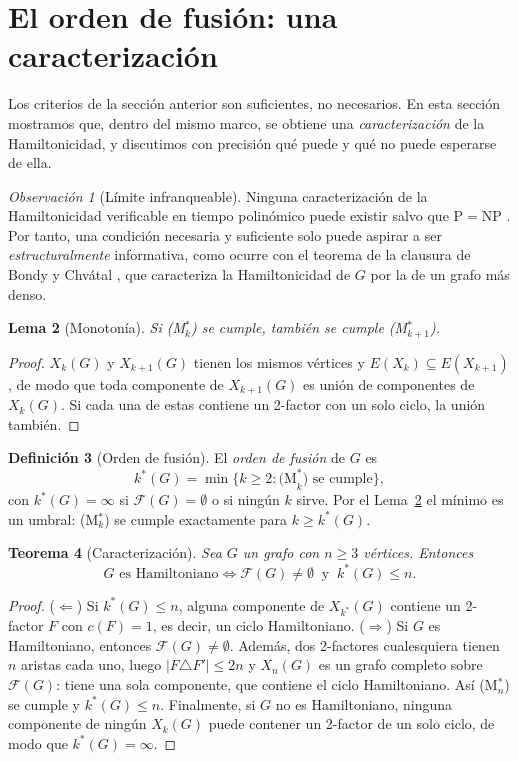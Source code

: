 \documentclass[11pt,a4paper]{article}
\newtheorem{teorema}{Teorema}[section]
\newtheorem{lema}[teorema]{Lema}
\theoremstyle{definition}
\newtheorem{definicion}[teorema]{Definición}
\theoremstyle{remark}
\newtheorem{observacion}[teorema]{Observación}
\begin{document}
\section{El orden de fusión: una caracterización}\label{sec:kstar}

Los criterios de la sección anterior son suficientes, no necesarios. En esta sección mostramos que, dentro del mismo marco, se obtiene una \emph{caracterización} de la Hamiltonicidad, y discutimos con precisión qué puede y qué no puede esperarse de ella.

\begin{observacion}[Límite infranqueable]
Ninguna caracterización de la Hamiltonicidad verificable en tiempo polinómico puede existir salvo que $\mathrm{P}=\mathrm{NP}$ \cite{karp}. Por tanto, una condición necesaria y suficiente solo puede aspirar a ser \emph{estructuralmente} informativa, como ocurre con el teorema de la clausura de Bondy y Chvátal \cite{bondychvatal}, que caracteriza la Hamiltonicidad de $G$ por la de un grafo más denso.
\end{observacion}

\begin{lema}[Monotonía]\label{lem:monotonia}
Si (M$^*_k$) se cumple, también se cumple (M$^*_{k+1}$).
\end{lema}

\begin{proof}
$X_k(G)$ y $X_{k+1}(G)$ tienen los mismos vértices y $E(X_k)\subseteq E(X_{k+1})$, de modo que toda componente de $X_{k+1}(G)$ es unión de componentes de $X_k(G)$. Si cada una de estas contiene un 2-factor con un solo ciclo, la unión también.
\end{proof}

\begin{definicion}[Orden de fusión]
El \emph{orden de fusión} de $G$ es
\[
k^*(G)=\min\{k\ge2 : \text{(M}^*_k)\text{ se cumple}\},
\]
con $k^*(G)=\infty$ si $\mathcal{F}(G)=\emptyset$ o si ningún $k$ sirve. Por el Lema~\ref{lem:monotonia} el mínimo es un umbral: (M$^*_k$) se cumple exactamente para $k\ge k^*(G)$.
\end{definicion}

\begin{teorema}[Caracterización]\label{thm:iff}
Sea $G$ un grafo con $n\ge3$ vértices. Entonces
\[
G \text{ es Hamiltoniano}\iff \mathcal{F}(G)\neq\emptyset \ \text{ y }\ k^*(G)\le n .
\]
\end{teorema}

\begin{proof}
($\Leftarrow$) Si $k^*(G)\le n$, alguna componente de $X_{k^*}(G)$ contiene un 2-factor $F$ con $c(F)=1$, es decir, un ciclo Hamiltoniano.
($\Rightarrow$) Si $G$ es Hamiltoniano, entonces $\mathcal{F}(G)\neq\emptyset$. Además, dos 2-factores cualesquiera tienen $n$ aristas cada uno, luego $|F\triangle F'|\le2n$ y $X_n(G)$ es un grafo completo sobre $\mathcal{F}(G)$: tiene una sola componente, que contiene el ciclo Hamiltoniano. Así (M$^*_n$) se cumple y $k^*(G)\le n$.
Finalmente, si $G$ no es Hamiltoniano, ninguna componente de ningún $X_k(G)$ puede contener un 2-factor de un solo ciclo, de modo que $k^*(G)=\infty$.
\end{proof}
\end{document}
